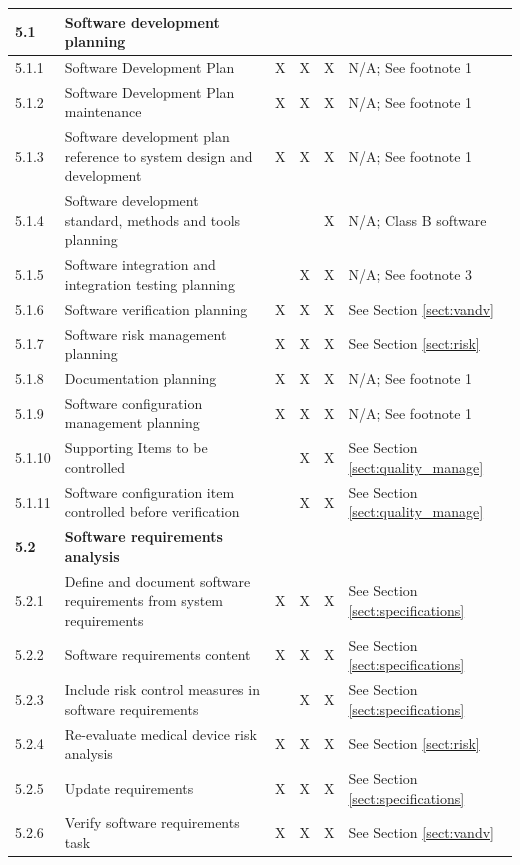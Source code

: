 \documentclass[]{article}
\begin{document}
\begin{center}
\begin{longtable}{ |p{1.3cm}| p{5.5cm}| p{0.7cm}| p{0.7cm}| p{0.7cm}| p{3.5cm}| }
	
	\rowcolor{blue!25} \textbf{5.1} & \textbf{Software development planning} &  & & & \\ \hline
	5.1.1 & Software Development Plan & X & X & X & N/A; See footnote 1 \\ \hline
	5.1.2 & Software Development Plan maintenance & X & X & X & N/A; See footnote 1 \\ \hline
	5.1.3 & Software development plan reference to system design and development & X & X & X & N/A; See footnote 1 \\ \hline
	5.1.4 & Software development standard, methods and tools planning &  &   & X & N/A; Class B software \\ \hline
	5.1.5 & Software integration and integration testing planning &  & X & X & N/A; See footnote 3  \\ \hline
	5.1.6 & Software verification planning & X & X & X &  See Section \ref{sect:vandv} \\ \hline
	5.1.7 & Software risk management planning & X & X & X & See Section \ref{sect:risk} \\ \hline
	5.1.8 & Documentation planning & X & X & X & N/A; See footnote 1 \\ \hline
	5.1.9 & Software configuration management planning & X & X & X & N/A; See footnote 1  \\ \hline
	5.1.10 & Supporting Items to be controlled &   & X & X & See Section \ref{sect:quality_manage} \\ \hline
	5.1.11 & Software configuration item controlled before verification &  & X & X & See Section \ref{sect:quality_manage} \\ \hline
	
	
	\rowcolor{blue!25} \textbf{5.2} & \textbf{Software requirements analysis } & &  & &  \\ \hline
	5.2.1 & Define and document software requirements from system requirements & X & X & X & See Section \ref{sect:specifications} \\ \hline
	5.2.2 & Software requirements content & X & X & X & See Section \ref{sect:specifications} \\ \hline
	5.2.3 & Include risk control measures in software requirements &  & X & X & See Section \ref{sect:specifications} \\ \hline
	5.2.4 & Re-evaluate medical device risk analysis & X & X & X & See Section \ref{sect:risk} \\ \hline
	5.2.5 & Update requirements & X & X & X & See Section \ref{sect:specifications} \\ \hline
	5.2.6 & Verify software requirements task & X & X & X & See Section \ref{sect:vandv} \\ \hline
	

\end{longtable}
\end{center}
\end{document}
